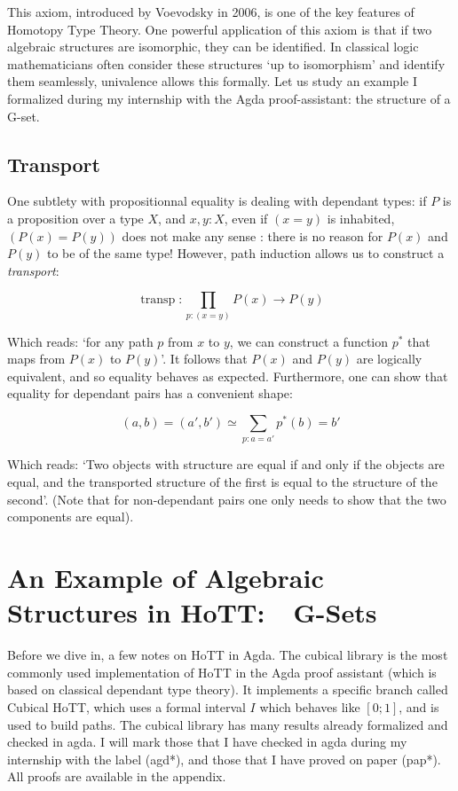\documentclass{article}
\DeclareMathOperator{\transp}{transp}
\begin{document}
This axiom, introduced by Voevodsky in 2006, is one of the key features of Homotopy Type Theory. One powerful application of this axiom is that if two algebraic structures are isomorphic, they can be identified. In classical logic mathematicians often consider these structures `up to isomorphism' and identify them seamlessly, univalence allows this formally. Let us study an example I formalized during my internship with the Agda proof-assistant: the structure of a G-set.

\subsection{Transport}

One subtlety with propositionnal equality is dealing with dependant types: if $P$ is a proposition over a type $X$, and $x,y : X$, even if $(x = y)$ is inhabited, $(P(x) = P(y))$ does not make any sense : there is no reason for $P(x)$ and $P(y)$ to be of the same type! However, path induction allows us to construct a \emph{transport}:

\[\transp : \prod_{p : (x = y)} P(x) \to P(y) \]

Which reads: `for any path $p$ from $x$ to $y$, we can construct a function $p^{*}$ that maps from $P(x)$ to $P(y)$'. It follows that $P(x)$ and $P(y)$ are logically equivalent, and so equality behaves as expected. Furthermore, one can show that equality for dependant pairs has a convenient shape:

\[(a, b) = (a', b') \simeq \sum_{p : a = a'}p^*(b) = b'\]

Which reads: `Two objects with structure are equal if and only if the objects are equal, and the transported structure of the first is equal to the structure of the second'. (Note that for non-dependant pairs one only needs to show that the two components are equal).

\section{An Example of Algebraic Structures in HoTT:\  G-Sets}

Before we dive in, a few notes on HoTT in Agda. The cubical library is the most commonly used implementation of HoTT in the Agda proof assistant (which is based on classical dependant type theory). It implements a specific branch called Cubical HoTT, which uses a formal interval $I$ which behaves like $[0;1]$, and is used to build paths. The cubical library has many results already formalized and checked in agda. I will mark those that I have checked in agda during my internship with the label (agd*), and those that I have proved on paper (pap*). All proofs are available in the appendix.
\end{document}
